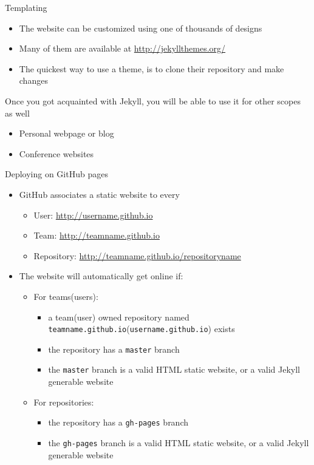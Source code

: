 \documentclass[presentation]{beamer}
\begin{document}
\begin{frame}{Templating}
    \begin{itemize}
        \item The website can be customized using one of thousands of designs
        \item Many of them are available at \url{http://jekyllthemes.org/}
        \item The quickest way to use a theme, is to clone their repository and make changes
    \end{itemize}
    Once you got acquainted with Jekyll, you will be able to use it for other scopes as well
    \begin{itemize}
        \item Personal webpage or blog
        \item Conference websites
    \end{itemize}
\end{frame}

\begin{frame}{Deploying on GitHub pages}
    \begin{itemize}
        \item GitHub associates a static website to every
        \begin{itemize}
            \item User: \url{http://username.github.io}
            \item Team: \url{http://teamname.github.io}
            \item Repository: \url{http://teamname.github.io/repositoryname}
        \end{itemize}
        \item The website will automatically get online if:
        \begin{itemize}
            \item For teams(users):
            \begin{itemize}
                \item a team(user) owned repository named \texttt{teamname.github.io}(\texttt{username.github.io}) exists
                \item the repository has a \texttt{master} branch
                \item the \texttt{master} branch is a valid HTML static website, or a valid Jekyll generable website
            \end{itemize}
            \item For repositories:
            \begin{itemize}
                \item the repository has a \texttt{gh-pages} branch
                \item the \texttt{gh-pages} branch is a valid HTML static website, or a valid Jekyll generable website
            \end{itemize}
        \end{itemize}
    \end{itemize}
\end{frame}
\end{document}

